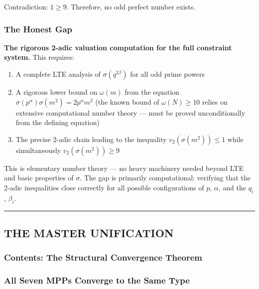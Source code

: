 \documentclass[10pt,a4paper]{article}
\begin{document}
Contradiction: $1 \geq 9$. Therefore, no odd perfect number exists.

\subsubsection{The Honest Gap}

\textbf{The rigorous 2-adic valuation computation for the full constraint system.} This requires:

\begin{enumerate}
    \item A complete LTE analysis of $\sigma(q^{2\beta})$ for all odd prime powers
    \item A rigorous lower bound on $\omega(m)$ from the equation $\sigma(p^\alpha) \sigma(m^2) = 2 p^\alpha m^2$ (the known bound of $\omega(N) \geq 10$ relies on extensive computational number theory --- must be proved unconditionally from the defining equation)
    \item The precise 2-adic chain leading to the inequality $v_2(\sigma(m^2)) \leq 1$ while simultaneously $v_2(\sigma(m^2)) \geq 9$
\end{enumerate}

This is elementary number theory --- no heavy machinery needed beyond LTE and basic properties of $\sigma$. The gap is primarily computational: verifying that the 2-adic inequalities close correctly for all possible configurations of $p$, $\alpha$, and the $q_i$, $\beta_i$.

\begin{center}
\rule{0.5\textwidth}{0.4pt}
\end{center}

\subsection{THE MASTER UNIFICATION}

\subsubsection{Contents: The Structural Convergence Theorem}

\subsubsection{All Seven MPPs Converge to the Same Type}
\end{document}
